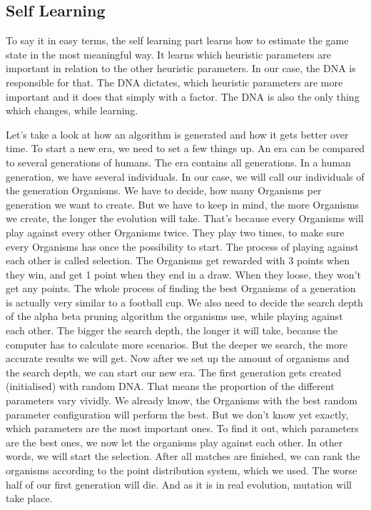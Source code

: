\subsection{Self Learning}
To say it in easy terms, the self learning part learns how to estimate the game state in the most meaningful way. It learns which heuristic parameters are important in relation to the other heuristic parameters. In our case, the DNA  is responsible for that. The DNA dictates, which heuristic parameters are more important and it does that simply with a factor. The DNA is also the only thing which changes, while learning. 

Let's take a look at how an algorithm is generated and how it gets better over time.
To start a new era, we need to set a few things up. An era can be compared to several generations of humans. 
The era contains all generations. In a human generation, we have several individuals. In our case, we will call our individuals of the generation Organisms. We have to decide, how many Organisms per generation we want to create. But we have to keep in mind, the more Organisms we create, the longer the evolution will take. That's because every Organisms will play against every other Organisms twice. They play two times, to make sure every Organisms has once the possibility to start. The process of playing against each other is called selection. The Organisms get rewarded with 3 points when they win, and get 1 point when they end in a draw. When they loose, they won't get any points. The whole process of finding the best Organisms of a generation is actually very similar to a football cup.
We also need to decide the search depth of the alpha beta pruning algorithm the organisms use, while playing against each other. The bigger the search depth, the longer it will take, because the computer has to calculate more scenarios. But the deeper we search, the more accurate results we will get. 
Now after we set up the amount of organisms and the search depth, we can start our new era. The first generation gets created (initialised) with random DNA. %
That means the proportion of the different parameters vary vividly. We already know, the Organisms with the best random parameter configuration will perform the best. But we don't know yet exactly, which parameters are the most important ones. To find it out, which parameters are the best ones, we now let the organisms play against each other. In other words, we will start the selection. After all matches are finished, we can rank the organisms according to the point distribution system, which we used. The worse half of our first generation will die. And as it is in real evolution, mutation will take place.
